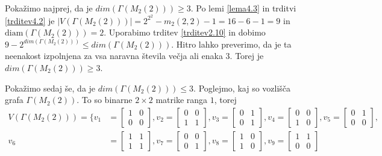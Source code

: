 \documentclass[mat1, tisk]{fmfdelo}
\begin{document}
\begin{dokaz}
  Pokažimo najprej, da je $dim(\Gamma(M_2(2))) \geq 3$. Po lemi \ref{lema4.3} in trditvi \ref{trditev4.2} je 
  $|V(\Gamma(M_2(2)))| = 2^{2^2} - m_2(2,2) - 1 = 16 - 6 - 1 = 9$ in $\text{diam}(\Gamma(M_2(2))) = 2$. Uporabimo 
  trditev \ref{trditev2.10} in dobimo $9 - 2^{dim(\Gamma(M_2(2)))} \leq dim(\Gamma(M_2(2)))$. Hitro lahko 
  preverimo, da je ta neenakost izpolnjena za vsa naravna števila večja ali enaka $3$. Torej je 
  $dim(\Gamma(M_2(2))) \geq 3$.

  Pokažimo sedaj še, da je $dim(\Gamma(M_2(2))) \leq 3$. Poglejmo, kaj so 
  vozlišča grafa $\Gamma(M_2(2))$. To so binarne $2 \times 2$ matrike ranga $1$, torej 
  \begin{align*}
    V(\Gamma(M_2(2))) = \biggl\{
    v_1 &= 
    \begin{bmatrix}
      1 & 0 \\
      0 & 0
    \end{bmatrix}, 
    v_2 = 
    \begin{bmatrix}
      0 & 0 \\
      1 & 1
    \end{bmatrix}, 
    v_3 = 
    \begin{bmatrix}
      0 & 1 \\
      0 & 1
    \end{bmatrix}, 
    v_4 = 
    \begin{bmatrix}
      0 & 0 \\
      1 & 0
    \end{bmatrix}, 
    v_5 = 
    \begin{bmatrix}
      0 & 1 \\
      0 & 0
    \end{bmatrix}, \\
    v_6 &= 
    \begin{bmatrix}
      1 & 1 \\
      1 & 1
    \end{bmatrix}, 
    v_7 = 
    \begin{bmatrix}
      0 & 0 \\
      0 & 1
    \end{bmatrix}, 
    v_8 = 
    \begin{bmatrix}
      1 & 0 \\
      1 & 0
    \end{bmatrix}, 
    v_9 = 
    \begin{bmatrix}
      1 & 1 \\
      0 & 0
    \end{bmatrix}

\end{align*}
\end{dokaz}
\end{document}
